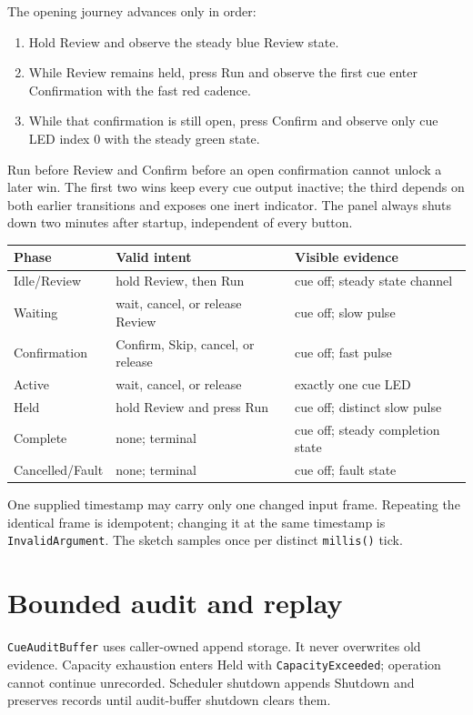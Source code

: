 \documentclass[11pt]{article}
\begin{document}
The opening journey advances only in order:

\begin{enumerate}
  \item Hold Review and observe the steady blue Review state.
  \item While Review remains held, press Run and observe the first cue enter
        Confirmation with the fast red cadence.
  \item While that confirmation is still open, press Confirm and observe only
        cue LED index 0 with the steady green state.
\end{enumerate}

Run before Review and Confirm before an open confirmation cannot unlock a
later win. The first two wins keep every cue output inactive; the third depends
on both earlier transitions and exposes one inert indicator. The panel always
shuts down two minutes after startup, independent of every button.

\begin{tabularx}{\linewidth}{@{}l X X@{}}
\toprule
Phase & Valid intent & Visible evidence\\
\midrule
Idle/Review & hold Review, then Run & cue off; steady state channel\\
Waiting & wait, cancel, or release Review & cue off; slow pulse\\
Confirmation & Confirm, Skip, cancel, or release & cue off; fast pulse\\
Active & wait, cancel, or release & exactly one cue LED\\
Held & hold Review and press Run & cue off; distinct slow pulse\\
Complete & none; terminal & cue off; steady completion state\\
Cancelled/Fault & none; terminal & cue off; fault state\\
\bottomrule
\end{tabularx}

One supplied timestamp may carry only one changed input frame. Repeating the
identical frame is idempotent; changing it at the same timestamp is
\texttt{InvalidArgument}. The sketch samples once per distinct
\texttt{millis()} tick.

\section{Bounded audit and replay}

\texttt{CueAuditBuffer} uses caller-owned append storage. It never overwrites
old evidence. Capacity exhaustion enters Held with \texttt{CapacityExceeded};
operation cannot continue unrecorded. Scheduler shutdown appends Shutdown and
preserves records until audit-buffer shutdown clears them.
\end{document}
